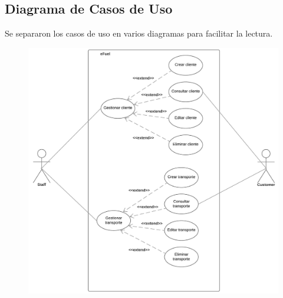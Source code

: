 \documentclass{article}
\begin{document}
    \subsection{Diagrama de Casos de Uso}
    Se separaron los casos de uso en varios diagramas para facilitar la lectura.

    \begin{figure}[H]
        \includegraphics[width=\textwidth]{cu1.jpeg}
        \centering
    \end{figure}
\end{document}
